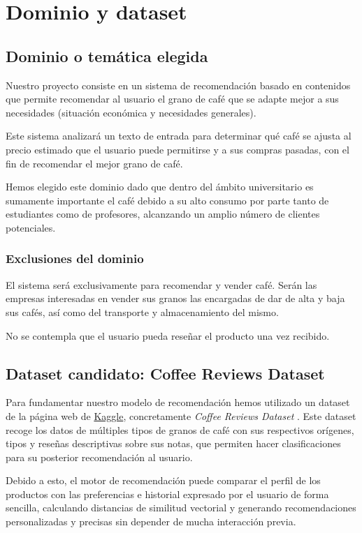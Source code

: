 \chapter{Dominio y dataset}

\section{Dominio o temática elegida}

Nuestro proyecto consiste en un sistema de recomendación basado en contenidos que permite recomendar al usuario el grano de café que se adapte mejor a sus necesidades (situación económica y necesidades generales).

Este sistema analizará un texto de entrada para determinar qué café se ajusta al precio estimado que el usuario puede permitirse y a sus compras pasadas, con el fin de recomendar el mejor grano de café.

Hemos elegido este dominio dado que dentro del ámbito universitario es sumamente importante el café debido a su alto consumo por parte tanto de estudiantes como de profesores, alcanzando un amplio número de clientes potenciales.

\subsection{Exclusiones del dominio}

El sistema será exclusivamente para recomendar y vender café. Serán las empresas interesadas en vender sus granos las encargadas de dar de alta y baja sus cafés, así como del transporte y almacenamiento del mismo.

No se contempla que el usuario pueda reseñar el producto una vez recibido.

\section{Dataset candidato: Coffee Reviews Dataset}

Para fundamentar nuestro modelo de recomendación hemos utilizado un dataset de la página web de \href{https://www.kaggle.com/search}{Kaggle}, concretamente \emph{Coffee Reviews Dataset} \cite{coffee-dataset}. Este dataset recoge los datos de múltiples tipos de granos de café con sus respectivos orígenes, tipos y reseñas descriptivas sobre sus notas, que permiten hacer clasificaciones para su posterior recomendación al usuario.

Debido a esto, el motor de recomendación puede comparar el perfil de los productos con las preferencias e historial expresado por el usuario de forma sencilla, calculando distancias de similitud vectorial y generando recomendaciones personalizadas y precisas sin depender de mucha interacción previa.

